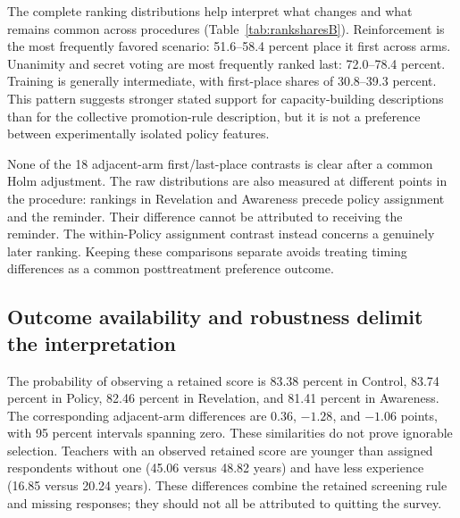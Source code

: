 \begin{addition}
The complete ranking distributions help interpret what changes and what remains common across procedures (Table~\ref{tab:ranksharesB}). Reinforcement is the most frequently favored scenario: 51.6--58.4 percent place it first across arms. Unanimity and secret voting are most frequently ranked last: 72.0--78.4 percent. Training is generally intermediate, with first-place shares of 30.8--39.3 percent. This pattern suggests stronger stated support for capacity-building descriptions than for the collective promotion-rule description, but it is not a preference between experimentally isolated policy features.

None of the 18 adjacent-arm first/last-place contrasts is clear after a common Holm adjustment. The raw distributions are also measured at different points in the procedure: rankings in Revelation and Awareness precede policy assignment and the reminder. Their difference cannot be attributed to receiving the reminder. The within-Policy assignment contrast instead concerns a genuinely later ranking. Keeping these comparisons separate avoids treating timing differences as a common posttreatment preference outcome.
\end{addition}

\subsection{Outcome availability and robustness delimit the interpretation}
The probability of observing a retained score is 83.38 percent in Control, 83.74 percent in Policy, 82.46 percent in Revelation, and 81.41 percent in Awareness. The corresponding adjacent-arm differences are 0.36, $-1.28$, and $-1.06$ points, with 95 percent intervals spanning zero. These similarities do not prove ignorable selection. Teachers with an observed retained score are younger than assigned respondents without one (45.06 versus 48.82 years) and have less experience (16.85 versus 20.24 years). These differences combine the retained screening rule and missing responses; they should not all be attributed to quitting the survey.


